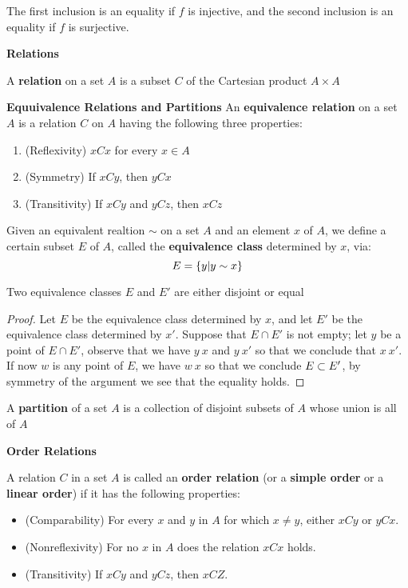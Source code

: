 The first inclusion is an equality if $f$ is injective, and the second inclusion is an equality if $f$ is surjective.

\textbf{Relations}

\begin{define}
	A \textbf{relation} on a set $A$ is a subset $C$ of the Cartesian product $A \times A$ 
\end{define}

\textbf{Equuivalence Relations and Partitions}
An \textbf{equivalence relation} on a set $A$ is a relation $C$ on $A$ having the following three properties:
\begin{enumerate}
	\item (Reflexivity) $xCx$ for every $ x \in A $
	\item (Symmetry) If $ xCy $, then $ yCx $ 
	\item (Transitivity) If $ xCy $ and $ yCz $, then $ xCz $
\end{enumerate}  

Given an equivalent realtion $ \sim $ on a set $A$ and an element $x$ of $A$, we define a certain subset $E$ of $A$, called the \textbf{equivalence class} determined by $x$, via:
\[ E = \left\lbrace y | y \sim x \right\rbrace \]

\begin{lem}
	Two equivalence classes $E$ and $E'$ are either disjoint or equal
\end{lem}

\begin{proof}
	Let $E$ be the equivalence class determined by $x$, and let $E'$ be the equivalence class determined by $x'$. Suppose that $ E \cap E'$ is not empty; let $y$ be a point of $ E \cap E'$, observe that we have $ y ~ x $ and $ y ~ x'$ so  that we conclude that $ x ~ x'$. If now $w$ is any point of $E$, we have $w ~ x$ so that we conclude $E \subset E'$, by symmetry of the argument we see that the equality holds.
\end{proof}

\begin{define}
	A \textbf{partition} of a set $A$ is a collection of disjoint subsets of $A$ whose union is all of $A$
\end{define}

\textbf{Order Relations}

A relation $C$ in a set $A$ is called an \textbf{order relation} (or a \textbf{simple order} or a \textbf{linear order}) if it has the following properties:

\begin{itemize}
	\item (Comparability) For every $x$ and $y$ in $A$ for which $ x \neq y$, either $ xCy$ or $yCx$.
	\item (Nonreflexivity) For no $x$ in $A$ does the relation $xCx$ holds.
	\item (Transitivity) If $xCy$ and $yCz$, then $xCZ$.
\end{itemize}

